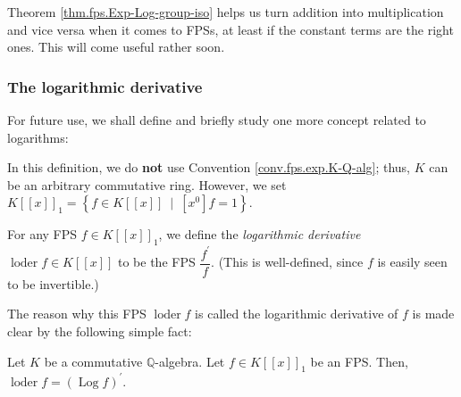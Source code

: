 Theorem \ref{thm.fps.Exp-Log-group-iso} helps us turn addition into
multiplication and vice versa when it comes to FPSs, at least if the constant
terms are the right ones. This will come useful rather soon.

\subsubsection{The logarithmic derivative}

For future use, we shall define and briefly study one more concept related to logarithms:

\begin{definition}
\label{def.fps.loder.1}In this definition, we do \textbf{not} use Convention
\ref{conv.fps.exp.K-Q-alg}; thus, $K$ can be an arbitrary commutative ring.
However, we set $K\left[  \left[  x\right]  \right]  _{1}=\left\{  f\in
K\left[  \left[  x\right]  \right]  \ \mid\ \left[  x^{0}\right]  f=1\right\}
$.

For any FPS $f\in K\left[  \left[  x\right]  \right]  _{1}$, we define the
\emph{logarithmic derivative} $\operatorname*{loder}f\in K\left[  \left[
x\right]  \right]  $ to be the FPS $\dfrac{f^{\prime}}{f}$. (This is
well-defined, since $f$ is easily seen to be invertible.\footnotemark)
\end{definition}

The reason why this FPS $\operatorname*{loder}%
f$ is called the logarithmic derivative of $f$ is made clear by the following
simple fact:

\begin{proposition}
\label{prop.fps.loder.log}Let $K$ be a commutative $\mathbb{Q}$-algebra. Let
$f\in K\left[  \left[  x\right]  \right]  _{1}$ be an FPS. Then,
$\operatorname*{loder}f=\left(  \operatorname*{Log}f\right)  ^{\prime}$.
\end{proposition}

